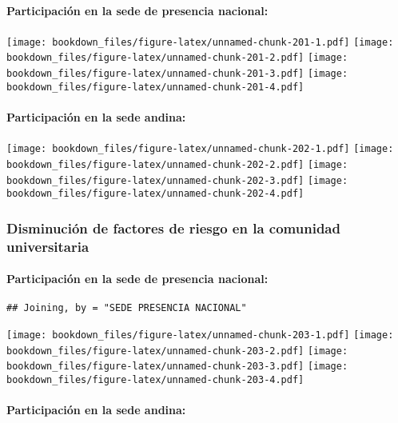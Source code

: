 \documentclass[]{article}
\let\oldparagraph\paragraph
\renewcommand{\paragraph}[1]{\oldparagraph{#1}\mbox{}}
\theoremstyle{definition}
\theoremstyle{definition}
\theoremstyle{definition}
\theoremstyle{remark}
\begin{document}
\paragraph{Participación en la sede de presencia
nacional:}\label{participacion-en-la-sede-de-presencia-nacional-17}

\texttt{[image: bookdown\_files/figure-latex/unnamed-chunk-201-1.pdf]}
\texttt{[image: bookdown\_files/figure-latex/unnamed-chunk-201-2.pdf]}
\texttt{[image: bookdown\_files/figure-latex/unnamed-chunk-201-3.pdf]}
\texttt{[image: bookdown\_files/figure-latex/unnamed-chunk-201-4.pdf]}

\paragraph{Participación en la sede
andina:}\label{participacion-en-la-sede-andina-17}

\texttt{[image: bookdown\_files/figure-latex/unnamed-chunk-202-1.pdf]}
\texttt{[image: bookdown\_files/figure-latex/unnamed-chunk-202-2.pdf]}
\texttt{[image: bookdown\_files/figure-latex/unnamed-chunk-202-3.pdf]}
\texttt{[image: bookdown\_files/figure-latex/unnamed-chunk-202-4.pdf]}

\subsubsection{Disminución de factores de riesgo en la comunidad
universitaria}\label{disminucion-de-factores-de-riesgo-en-la-comunidad-universitaria-1}

\paragraph{Participación en la sede de presencia
nacional:}\label{participacion-en-la-sede-de-presencia-nacional-18}

\begin{verbatim}
## Joining, by = "SEDE PRESENCIA NACIONAL"
\end{verbatim}

\texttt{[image: bookdown\_files/figure-latex/unnamed-chunk-203-1.pdf]}
\texttt{[image: bookdown\_files/figure-latex/unnamed-chunk-203-2.pdf]}
\texttt{[image: bookdown\_files/figure-latex/unnamed-chunk-203-3.pdf]}
\texttt{[image: bookdown\_files/figure-latex/unnamed-chunk-203-4.pdf]}

\paragraph{Participación en la sede
andina:}\label{participacion-en-la-sede-andina-18}
\end{document}
